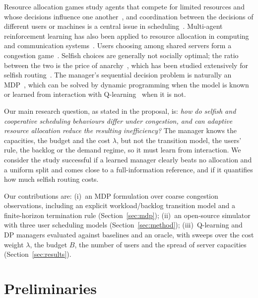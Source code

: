\documentclass{article}
\begin{document}
Resource allocation games study agents that compete for limited resources and whose
decisions influence one another~\cite{avni2020dynamic}, and coordination between the
decisions of different users or machines is a central issue in
scheduling~\cite{lee2012coordination}. Multi-agent reinforcement learning has also been
applied to resource allocation in computing and communication systems~\cite{liu2020marl}.
Users choosing among shared servers form a congestion game~\cite{rosenthal1973}. Selfish choices are generally not socially optimal; the
ratio between the two is the price of anarchy~\cite{koutsoupias1999}, which has been
studied extensively for selfish routing~\cite{roughgarden2002}. The manager's sequential
decision problem is naturally an MDP~\cite{puterman1994}, which can be solved by dynamic
programming when the model is known~\cite{bellman1957} or learned from interaction with
Q-learning~\cite{watkins1992,sutton2018} when it is not.

Our main research question, as stated in the proposal, is: \emph{how do selfish and
cooperative scheduling behaviours differ under congestion, and can adaptive resource
allocation reduce the resulting inefficiency?} The manager knows the capacities, the
budget and the cost $\lambda$, but not the transition model, the users' rule, the backlog
or the demand regime, so it must learn from interaction. We consider the study successful
if a learned manager clearly beats no allocation and a uniform split and comes close to a
full-information reference, and if it quantifies how much selfish routing costs.

Our contributions are: (i)~an MDP formulation over coarse congestion observations, including an explicit workload/backlog
transition model and a finite-horizon termination rule (Section~\ref{sec:mdp});
(ii)~an open-source simulator with three user scheduling models
(Section~\ref{sec:method}); (iii)~Q-learning and DP managers evaluated against
baselines and an oracle, with sweeps over the cost weight $\lambda$, the budget $B$, the
number of users and the spread of server capacities (Section~\ref{sec:results}).

\section{Preliminaries}\label{sec:prelim}
\end{document}

